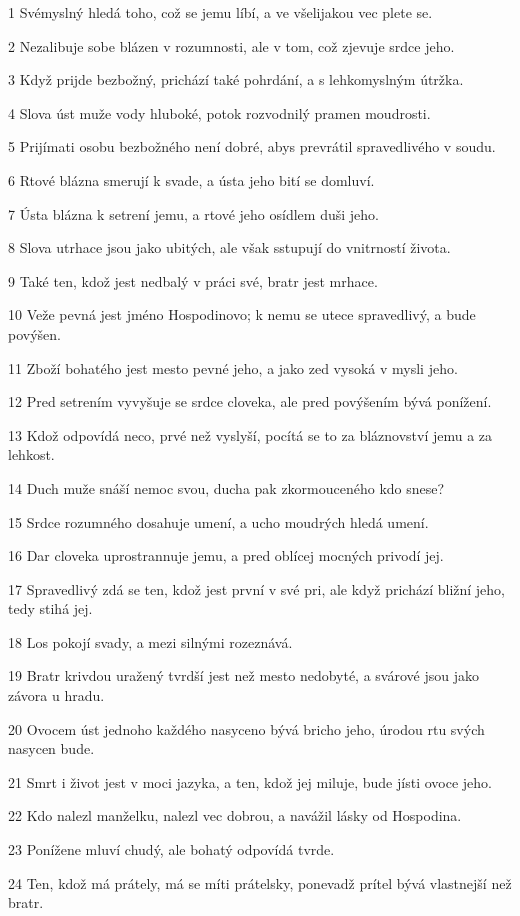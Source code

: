\par 1 Svémyslný hledá toho, což se jemu líbí, a ve všelijakou vec plete se.
\par 2 Nezalibuje sobe blázen v rozumnosti, ale v tom, což zjevuje srdce jeho.
\par 3 Když prijde bezbožný, prichází také pohrdání, a s lehkomyslným útržka.
\par 4 Slova úst muže vody hluboké, potok rozvodnilý pramen moudrosti.
\par 5 Prijímati osobu bezbožného není dobré, abys prevrátil spravedlivého v soudu.
\par 6 Rtové blázna smerují k svade, a ústa jeho bití se domluví.
\par 7 Ústa blázna k setrení jemu, a rtové jeho osídlem duši jeho.
\par 8 Slova utrhace jsou jako ubitých, ale však sstupují do vnitrností života.
\par 9 Také ten, kdož jest nedbalý v práci své, bratr jest mrhace.
\par 10 Veže pevná jest jméno Hospodinovo; k nemu se utece spravedlivý, a bude povýšen.
\par 11 Zboží bohatého jest mesto pevné jeho, a jako zed vysoká v mysli jeho.
\par 12 Pred setrením vyvyšuje se srdce cloveka, ale pred povýšením bývá ponížení.
\par 13 Kdož odpovídá neco, prvé než vyslyší, pocítá se to za bláznovství jemu a za lehkost.
\par 14 Duch muže snáší nemoc svou, ducha pak zkormouceného kdo snese?
\par 15 Srdce rozumného dosahuje umení, a ucho moudrých hledá umení.
\par 16 Dar cloveka uprostrannuje jemu, a pred oblícej mocných privodí jej.
\par 17 Spravedlivý zdá se ten, kdož jest první v své pri, ale když prichází bližní jeho, tedy stihá jej.
\par 18 Los pokojí svady, a mezi silnými rozeznává.
\par 19 Bratr krivdou uražený tvrdší jest než mesto nedobyté, a svárové jsou jako závora u hradu.
\par 20 Ovocem úst jednoho každého nasyceno bývá bricho jeho, úrodou rtu svých nasycen bude.
\par 21 Smrt i život jest v moci jazyka, a ten, kdož jej miluje, bude jísti ovoce jeho.
\par 22 Kdo nalezl manželku, nalezl vec dobrou, a navážil lásky od Hospodina.
\par 23 Ponížene mluví chudý, ale bohatý odpovídá tvrde.
\par 24 Ten, kdož má prátely, má se míti prátelsky, ponevadž prítel bývá vlastnejší než bratr.


